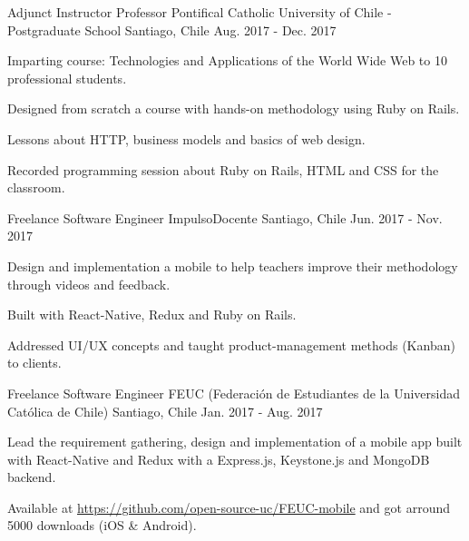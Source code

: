 \begin{cventries}
  \cventry
    {Adjunct Instructor Professor}
    {Pontifical Catholic University of Chile - Postgraduate School}
    {Santiago, Chile}
    {Aug. 2017 - Dec. 2017}
    {
      \begin{cvitems}
        \item {Imparting course: Technologies and Applications of the World Wide Web to 10 professional students.}
        \item {Designed from scratch a course with hands-on methodology using Ruby on Rails.}
        \item {Lessons about HTTP, business models and basics of web design.}
        \item {Recorded programming session about Ruby on Rails, HTML and CSS for the classroom.}
      \end{cvitems}
    }

  \cventry
    {Freelance Software Engineer}
    {ImpulsoDocente}
    {Santiago, Chile}
    {Jun. 2017 - Nov. 2017}
    {
      \begin{cvitems}
        \item {Design and implementation a mobile to help teachers improve their methodology through videos and feedback.}
        \item Built with React-Native, Redux and Ruby on Rails.
        \item {Addressed UI/UX concepts and taught product-management methods (Kanban) to clients.}
      \end{cvitems}
    }

  \cventry
    {Freelance Software Engineer}
    {FEUC (Federación de Estudiantes de la Universidad Católica de Chile)}
    {Santiago, Chile}
    {Jan. 2017 - Aug. 2017}
    {
      \begin{cvitems}
        \item {Lead the requirement gathering, design and implementation of a mobile app built with React-Native and Redux with a Express.js, Keystone.js and MongoDB backend.}
        \item Available at \url{https://github.com/open-source-uc/FEUC-mobile} and got arround 5000 downloads (iOS \& Android).
      \end{cvitems}
    }
    

\end{cventries}
